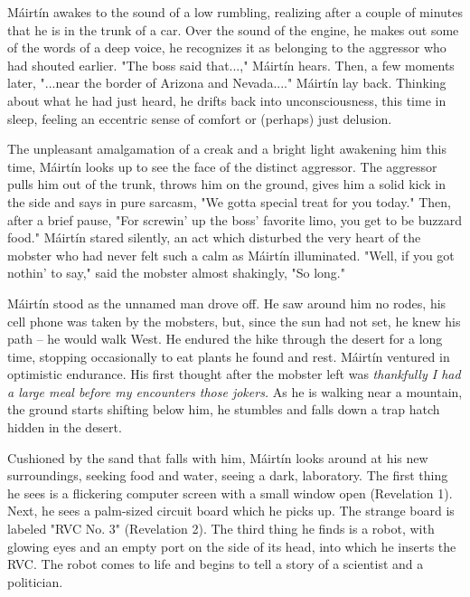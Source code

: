 \documentclass[12pt]{article}
\newcommand{\mcs}{M\'airt\'in }
\begin{document}
\begin{flushleft}
\mcs awakes to the sound of a low rumbling, realizing after a couple of minutes that he is in the trunk of a car.
Over the sound of the engine, he makes out some of the words of a deep voice, he recognizes it as belonging
to the aggressor who had shouted earlier. "The boss said that...," \mcs hears. Then, a few moments later, "...near
the border of Arizona and Nevada...." \mcs lay back. Thinking about what he had just heard, he drifts back
into unconsciousness, this time in sleep, feeling an eccentric sense of comfort or (perhaps) just delusion. 

The unpleasant amalgamation of a creak and a bright light awakening him this time, \mcs looks up to see the face of the
distinct aggressor. The aggressor pulls him out of the trunk, throws him on the ground, gives him a solid kick in the
side and says in pure sarcasm, "We gotta special treat for you today." Then, after a brief pause, "For screwin'
up the boss' favorite limo, you get to be buzzard food." \mcs stared silently, an act which disturbed the very heart of
the mobster who had never felt such a calm as \mcs illuminated. "Well, if you got nothin' to say," said the mobster almost
shakingly, "So long."

\mcs stood as the unnamed man drove off. He saw around him no rodes, his cell phone was taken by the mobsters, but,
since the sun had not set, he knew his path -- he would walk West. He endured the hike through the desert for a long time, stopping
occasionally to eat plants he found and rest. \mcs ventured in optimistic endurance. His first thought after the mobster left
was \emph{thankfully I had a large meal before my encounters those jokers.} As he is walking near a mountain, the ground starts
shifting below him, he stumbles and falls down a trap hatch hidden in the desert.

Cushioned by the sand that falls with him, \mcs looks around at his new surroundings, seeking food and water, seeing
a dark, laboratory. The first thing he sees is a flickering computer screen with a small window open (Revelation 1). Next,
he sees a palm-sized circuit board which he picks up. The strange board is labeled "RVC No. 3" (Revelation 2). The third
thing he finds is a robot, with glowing eyes and an empty port on the side of its head, into which he inserts the RVC.
The robot comes to life and begins to tell a story of a scientist and a politician.


\end{flushleft}
\end{document}
